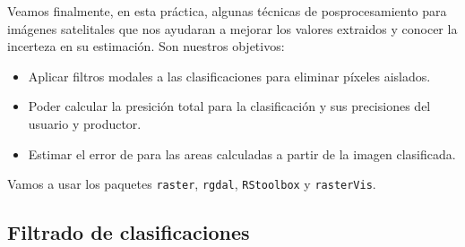 Veamos finalmente, en esta pr\'actica, algunas t\'ecnicas de posprocesamiento
para im\'agenes satelitales que nos ayudaran a mejorar los valores extraidos
y conocer la incerteza en su estimaci\'on. Son nuestros objetivos:

\begin{itemize}
  \item Aplicar filtros modales a las clasificaciones para eliminar p\'ixeles
  aislados.
  \item Poder calcular la presici\'on total para la clasificaci\'on y sus precisiones
  del usuario y productor.
  \item Estimar el error de para las areas calculadas a partir de la imagen
  clasificada.
\end{itemize}

Vamos a usar los paquetes \texttt{raster}, \texttt{rgdal}, \texttt{RStoolbox} y
\texttt{rasterVis}.

\subsection{Filtrado de clasificaciones}

